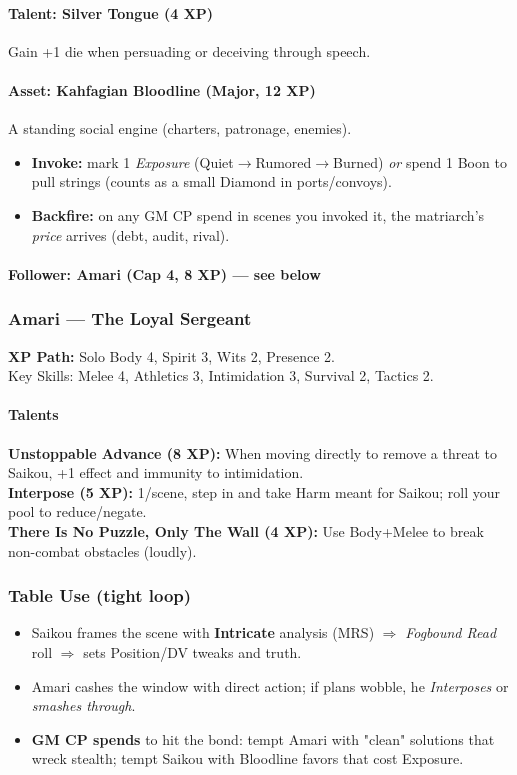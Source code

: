 \paragraph{Talent: Silver Tongue (4 XP)}
Gain +1 die when persuading or deceiving through speech.

\paragraph{Asset: Kahfagian Bloodline (Major, 12 XP)}
A standing social engine (charters, patronage, enemies).
\begin{itemize}
  \item \textbf{Invoke:} mark 1 \emph{Exposure} (Quiet$\to$Rumored$\to$Burned) \emph{or} spend 1 Boon to pull strings (counts as a small Diamond in ports/convoys).
  \item \textbf{Backfire:} on any GM CP spend in scenes you invoked it, the matriarch's \emph{price} arrives (debt, audit, rival).
\end{itemize}

\paragraph{Follower: Amari (Cap 4, 8 XP) — see below}

\subsubsection{Amari — The Loyal Sergeant}
\textbf{XP Path:} Solo \quad
Body 4, Spirit 3, Wits 2, Presence 2.\\
Key Skills: Melee 4, Athletics 3, Intimidation 3, Survival 2, Tactics 2.

\paragraph{Talents}
\textbf{Unstoppable Advance (8 XP):} When moving directly to remove a threat to Saikou, +1 effect and immunity to intimidation.\\
\textbf{Interpose (5 XP):} 1/scene, step in and take Harm meant for Saikou; roll your pool to reduce/negate.\\
\textbf{There Is No Puzzle, Only The Wall (4 XP):} Use Body+Melee to break non-combat obstacles (loudly).

\subsubsection{Table Use (tight loop)}
\begin{itemize}
  \item Saikou frames the scene with \textbf{Intricate} analysis (MRS) $\Rightarrow$ \emph{Fogbound Read} roll $\Rightarrow$ sets Position/DV tweaks and truth.
  \item Amari cashes the window with direct action; if plans wobble, he \emph{Interposes} or \emph{smashes through}.
  \item \textbf{GM CP spends} to hit the bond: tempt Amari with "clean" solutions that wreck stealth; tempt Saikou with Bloodline favors that cost Exposure.
\end{itemize}

